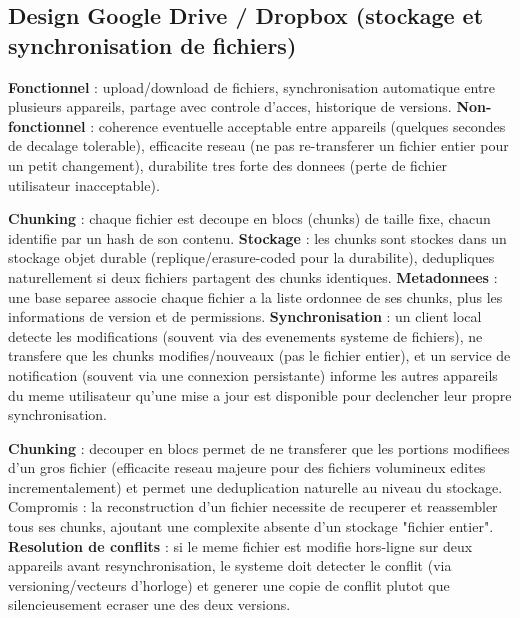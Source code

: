 \documentclass[11pt,a4paper]{article}
\newenvironment{sujet}[1]{%
  \subsection{#1}
}{%
  \bigskip
}
\begin{document}
\begin{sujet}{Design Google Drive / Dropbox (stockage et synchronisation de fichiers)}

\begin{req}
\textbf{Fonctionnel} : upload/download de fichiers, synchronisation automatique entre plusieurs appareils, partage avec controle d'acces, historique de versions. \textbf{Non-fonctionnel} : coherence eventuelle acceptable entre appareils (quelques secondes de decalage tolerable), efficacite reseau (ne pas re-transferer un fichier entier pour un petit changement), durabilite tres forte des donnees (perte de fichier utilisateur inacceptable).
\end{req}

\begin{archbox}
\textbf{Chunking} : chaque fichier est decoupe en blocs (chunks) de taille fixe, chacun identifie par un hash de son contenu. \textbf{Stockage} : les chunks sont stockes dans un stockage objet durable (replique/erasure-coded pour la durabilite), dedupliques naturellement si deux fichiers partagent des chunks identiques. \textbf{Metadonnees} : une base separee associe chaque fichier a la liste ordonnee de ses chunks, plus les informations de version et de permissions. \textbf{Synchronisation} : un client local detecte les modifications (souvent via des evenements systeme de fichiers), ne transfere que les chunks modifies/nouveaux (pas le fichier entier), et un service de notification (souvent via une connexion persistante) informe les autres appareils du meme utilisateur qu'une mise a jour est disponible pour declencher leur propre synchronisation.
\end{archbox}

\begin{tradeoff}
\textbf{Chunking} : decouper en blocs permet de ne transferer que les portions modifiees d'un gros fichier (efficacite reseau majeure pour des fichiers volumineux edites incrementalement) et permet une deduplication naturelle au niveau du stockage. Compromis : la reconstruction d'un fichier necessite de recuperer et reassembler tous ses chunks, ajoutant une complexite absente d'un stockage "fichier entier". \textbf{Resolution de conflits} : si le meme fichier est modifie hors-ligne sur deux appareils avant resynchronisation, le systeme doit detecter le conflit (via versioning/vecteurs d'horloge) et generer une copie de conflit plutot que silencieusement ecraser une des deux versions.
\end{tradeoff}

\end{sujet}
\end{document}
